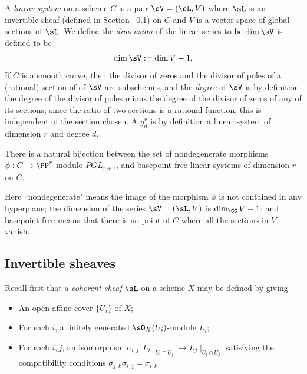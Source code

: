 \begin{definition}
 A \emph{linear system} on a scheme $C$ is a pair $\sV  = (\sL, V)$ where $\sL$ is an invertible sheaf (defined in Section ~\ref{Invertible sheaves}) on $C$ and
 $V$ is a vector space of global sections of $\sL$. We define the \emph{dimension} of the linear series to be $\dim \sV$ is defined to be
 $$
 \dim \sV := \dim V -1,
 $$
 If $C$ is a smooth curve, then the divisor of zeros and the divisor of poles of a (rational) section of of $\sV$ are subschemes, and the \emph{degree} of $\sV$ is by definition the degree of the divisor of poles minus the degree of the divisor of zeros of any of its sections; since the 
 ratio of two sections is a rational function, this is independent of the section chosen. A $g^r_d$ is by definition a linear system
 of dimension $r$ and degree $d$.
\end{definition}



\begin{theorem}\label{morphisms and linear systems}
There is a natural bijection between the set of nondegenerate morphisms $\phi : C \to \PP^r$ modulo $PGL_{r+1}$, and basepoint-free linear systems of dimension $r$ on $C$.\end{theorem}

Here ``nondegenerate" means the image of the morphism $\phi$ is not contained in any hyperplane; the dimension of the series
 $\sV  = (\sL, V)$ is $\dim_\CC V -1$; and basepoint-free means that there is no point of $C$ where all the sections in $V$
vanish.


\subsection{Invertible sheaves}\label{Invertible sheaves}
Recall first that a \emph{coherent sheaf} $\sL$ on a scheme $X$ may be defined by
giving 
\begin{itemize}
 \item An open affine cover $\{U_{i}\}$ of $X$; 
 \item For each $i$, a finitely generated $\sO_{X}(U_{i})$-module $L_{i}$;
 \item For each $i,j$, an isomorphism $\sigma_{i,j}: L_{i}\mid_{U_{i}\cap U_{j}} \to L_{j}\mid_{U_{i}\cap U_{j}}$
 satisfying the compatibility conditions $\sigma_{j,k}\sigma_{i,j} = \sigma_{i,k}$. 
 \end{itemize}

